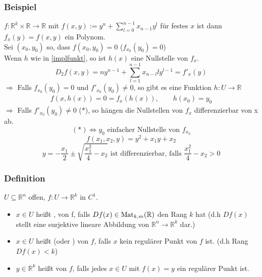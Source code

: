 \subsubsection{Beispiel} %
\label{ssub:beispiel}
$f: \mathbb{R}^k \times \mathbb{R} \to \mathbb{R}$ mit $f(x,y):= y^n + \sum_{l=0}^{n-1}x_{n-1}y^l$ für festes $x$ ist dann $f_x(y)=f(x,y)$ ein Polynom. \\
Sei $(x_0,y_0)$ so, dass $f(x_0,y_0)=0$ ($f_{x_0}(y_0)=0$) \\
Wenn $h$ wie in \ref{implfunkt}, so ist $h(x)$ eine Nullstelle von $f_x$.
\[
	D_2f(x,y)=ny^{n-1}+ \sum_{l=1}^{n-1}x_{n-l}ly^{l-1}=f'_x(y)
\]
$\Rightarrow$ Falls $f_{x_0}(y_0)=0$ und $f'_{x_0}(y_0) \neq 0$, so gibt es eine Funktion $h:U \to \mathbb{R}$
\begin{align*}
	f(x,h(x))=0 = f_x(h(x)), \qquad h(x_0)=y_0
\end{align*}
$\Rightarrow$ Falls $f'_{x_0}(y_0)\neq 0$ ($*$), so hängen die Nullstellen von $f_x$ differenzierbar von x ab. \\
\[
	(*) \Leftrightarrow y_0 \text{ einfacher Nullstelle von }f_{x_0}
\]
 \[
	f(x_1,x_2,y)=y^2 + x_1y + x_2
\]
\[
	y = - \frac{x_1}{2} \pm \sqrt{\frac{x_1^2}{4}-x_2} \text{ ist differenzierbar, falls } \frac{x_1^2}{4}-x_2 > 0
\]
\hphantom{p}
\hphantom{p}
\subsubsection{Definition} %
\label{ssub:definition}
$ U \subseteq \mathbb{R}^n$ offen, $f: U \to \mathbb{R}^k$ in $C^1$. \\
\begin{itemize}
	\item $x \in U$ heißt , von f, falls $Df(x) \in \operatorname{Mat}_{k,m}(\mathbb{R})$ den Rang $k$ hat (d.h $Df(x)$ stellt eine surjektive lineare Abbildung von $\mathbb{R}^n \to \mathbb{R}^k$ dar.)
	\item $x \in U$ heißt  (oder ) von $f$, falls $x$ kein regulärer Punkt von $f$ ist. (d.h Rang $Df(x) < k$)
	\item $y \in \mathbb{R}^k$ heißt  von $f$, falls jedes $x \in U$ mit $f(x)=y$ ein regulärer Punkt ist.
\end{itemize} 

	